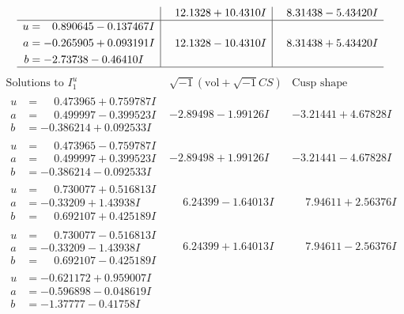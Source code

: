 \documentclass[1p]{elsarticle_modified}
\theoremstyle{definition}
\newcommand{\I}{\sqrt{-1}}
\begin{document}
$$\begin{array}{c|c|c}
 & \phantom{-}12.1328 + 10.4310 I & \phantom{-}8.31438 - 5.43420 I \\ \hline\begin{aligned}
u &= \phantom{-}0.890645 - 0.137467 I \\
a &= -0.265905 + 0.093191 I \\
b &= -2.73738 - 0.46410 I\end{aligned}
 & \phantom{-}12.1328 - 10.4310 I & \phantom{-}8.31438 + 5.43420 I\\
 \hline 
 \end{array}$$\newpage$$\begin{array}{c|c|c}  
\text{Solutions to }I^u_{1}& \I (\text{vol} + \sqrt{-1}CS) & \text{Cusp shape}\\
 \hline 
\begin{aligned}
u &= \phantom{-}0.473965 + 0.759787 I \\
a &= \phantom{-}0.499997 - 0.399523 I \\
b &= -0.386214 + 0.092533 I\end{aligned}
 & -2.89498 - 1.99126 I & -3.21441 + 4.67828 I \\ \hline\begin{aligned}
u &= \phantom{-}0.473965 - 0.759787 I \\
a &= \phantom{-}0.499997 + 0.399523 I \\
b &= -0.386214 - 0.092533 I\end{aligned}
 & -2.89498 + 1.99126 I & -3.21441 - 4.67828 I \\ \hline\begin{aligned}
u &= \phantom{-}0.730077 + 0.516813 I \\
a &= -0.33209 + 1.43938 I \\
b &= \phantom{-}0.692107 + 0.425189 I\end{aligned}
 & \phantom{-}6.24399 - 1.64013 I & \phantom{-}7.94611 + 2.56376 I \\ \hline\begin{aligned}
u &= \phantom{-}0.730077 - 0.516813 I \\
a &= -0.33209 - 1.43938 I \\
b &= \phantom{-}0.692107 - 0.425189 I\end{aligned}
 & \phantom{-}6.24399 + 1.64013 I & \phantom{-}7.94611 - 2.56376 I \\ \hline\begin{aligned}
u &= -0.621172 + 0.959007 I \\
a &= -0.596898 - 0.048619 I \\
b &= -1.37777 - 0.41758 I\end{aligned}

\end{array}$$
\end{document}
